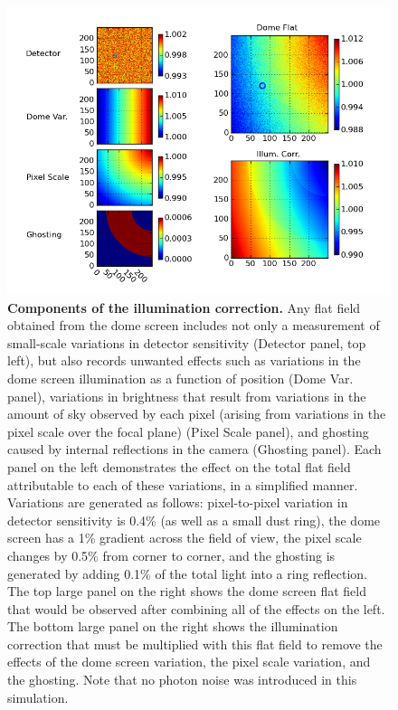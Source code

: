 \documentclass[12pt,preprint]{aastex}
\begin{document}
\begin{figure}[htbp]
\includegraphics[width=6in]{flatfield_corr}
\caption{ {\small
{\bf Components of the illumination correction.}
Any flat field obtained from the dome screen includes not only a
measurement of small-scale variations in detector sensitivity
(Detector panel, top left), but
also records unwanted effects such as variations in the dome screen
illumination as a function of position (Dome Var. panel), variations in brightness that
result from variations in the amount of sky observed by each pixel
(arising from variations in the pixel scale over the focal plane)
(Pixel Scale panel), and
ghosting caused by internal reflections in the camera (Ghosting panel).
Each panel on the left demonstrates the effect on the total flat field
attributable to each of these variations, in a simplified manner. 
Variations are generated as follows: pixel-to-pixel variation in
detector sensitivity is 0.4\% (as well as a small dust ring), the dome
screen has a 1\% gradient across the field of view, the pixel scale
changes by 0.5\% from corner to corner, and the ghosting is generated
by adding 0.1\% of the total light into a ring reflection. 
The top large panel on the right shows the dome screen flat field that
would be observed after combining all of the effects on the left. The bottom large panel on
the right shows the illumination correction that must be multiplied with 
this flat field to remove the effects of the dome screen variation,
the pixel scale variation, and the ghosting.   Note that no photon noise was
introduced in this simulation.  \label{fig:flatfield}
} }
\end{figure}
\end{document}

